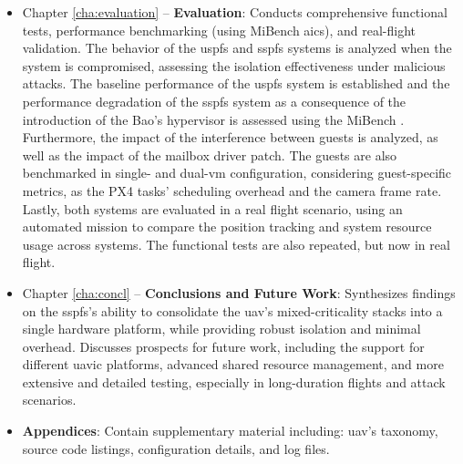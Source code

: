 \begin{itemize}
\item 
Chapter \ref{cha:evaluation} --  \textbf{Evaluation}:
Conducts comprehensive functional tests, performance benchmarking (using MiBench
\gls{aics}), and real-flight validation. The behavior of the \gls{uspfs} and
\gls{sspfs} systems is analyzed when the system is compromised, assessing the
isolation effectiveness under malicious attacks.
The baseline performance of the \gls{uspfs} system is
established and the performance degradation of the \gls{sspfs} system as a
consequence of the introduction of the Bao's hypervisor is assessed using the
MiBench .
Furthermore, the impact of the interference between guests is analyzed, as well
as the impact of the mailbox driver patch. The guests are also benchmarked in
single- and dual-\gls{vm} configuration, considering guest-specific metrics, as
the PX4 tasks' scheduling overhead and the camera frame rate.
Lastly, both systems are evaluated in a real flight scenario, using an automated
mission to compare the position tracking and system resource usage across
systems. The functional tests are also repeated, but now in real flight.
    
\item 
Chapter \ref{cha:concl} -- \textbf{Conclusions and Future Work}:
Synthesizes findings on the \gls{sspfs}'s ability to consolidate the \gls{uav}'s
mixed-criticality stacks into a single hardware platform, while providing robust isolation and minimal overhead. Discusses prospects
for future work, including the support for different \gls{uavic} platforms,
advanced shared resource management, and more extensive and detailed testing,
especially in long-duration flights and attack scenarios.

\item
\textbf{Appendices}: Contain supplementary material including: \gls{uav}'s taxonomy, source code
listings, configuration details, and log files.
\end{itemize}


